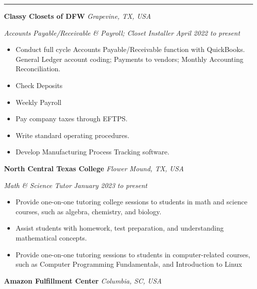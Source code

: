 \documentclass[10pt, a4paper]{article}
\newcommand{\rangesep}{to\xspace}  %
\renewcommand{\date}[1]{\textit{#1}}
\newcommand{\location}[1]{\textit{#1}}
\newcommand{\heading}[1]{
    \makebox[0pt][l]{\Large \sc \hspace{2pt}#1}
    \rule[-0.7ex]{\columnwidth}{0.5pt}\vspace{1.0ex}
}
\newcommand{\subheading}[1]{{\bfseries #1}}
\newcommand{\subheadSkip}{\vspace{0.7ex}}
\newenvironment{mysection}[1]
{\vspace{2.5ex}
\heading{#1}
\begin{adjustwidth}{0.3cm}{0cm}}
{\end{adjustwidth} }
\begin{document}
    \begin{mysection}{Employment}
        \subheading{Classy Closets of DFW} \hfill \location{Grapevine, TX, USA}

        \textit{Accounts Payable/Receivable \& Payroll; Closet Installer } \hfill \date{April 2022 \rangesep present}

        \vspace{0.1ex}


        \begin{itemize}
            \item Conduct full cycle Accounts Payable/Receivable function with QuickBooks. General Ledger account coding; Payments to vendors; Monthly Accounting Reconciliation.
            \item Check Deposits 
            \item Weekly Payroll 
            \item Pay company taxes through EFTPS.
            \item Write standard operating procedures.
            \item Develop Manufacturing Process Tracking software.
        \end{itemize}

        \subheadSkip
        \subheading{North Central Texas College} \hfill \location{Flower Mound, TX, USA}

        \vspace{0.1ex}
        \textit{Math \& Science Tutor} \hfill \date{January 2023 \rangesep present}
        \begin{itemize}
            \item Provide one-on-one tutoring college sessions to students in math and science courses, such as algebra, chemistry, and biology.
            \item Assist students with homework, test preparation, and understanding mathematical concepts.
            \item Provide one-on-one tutoring sessions to students in computer-related courses, such as Computer Programming Fundamentals, and Introduction to Linux 
        \end{itemize}

        \subheadSkip
        \subheading{Amazon Fulfillment Center} \hfill \location{Columbia, SC, USA}


\end{mysection}
\end{document}
